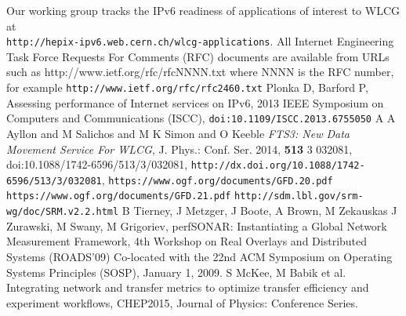 \begin{thebibliography}{1}
 Our working group tracks the IPv6 readiness of applications
of interest to WLCG at\\ {\tt http://hepix-ipv6.web.cern.ch/wlcg-applications}.
 All Internet Engineering Task Force Requests For Comments (RFC) documents are available
from URLs such as http://www.ietf.org/rfc/rfcNNNN.txt where NNNN is the RFC number, for example {\tt http://www.ietf.org/rfc/rfc2460.txt}
 Plonka D, Barford P, Assessing performance of Internet services on IPv6, 2013 IEEE Symposium on Computers and Communications (ISCC), {\tt doi:10.1109/ISCC.2013.6755050}
 {A A Ayllon and M Salichos and M K Simon and O Keeble} {\it {FTS}3: New Data Movement Service For {WLCG}}, {J. Phys.: Conf. Ser.} 2014, {\bf 513} 3 032081,  doi:{10.1088/1742-6596/513/3/032081}, {\tt{http://dx.doi.org/10.1088/1742-6596/513/3/032081}},
 {\tt https://www.ogf.org/documents/GFD.20.pdf} 
 {\tt https://www.ogf.org/documents/GFD.21.pdf} 
 {\tt http://sdm.lbl.gov/srm-wg/doc/SRM.v2.2.html}
 B Tierney, J Metzger, J Boote, A Brown, M Zekauskas
J Zurawski, M Swany, M Grigoriev, perfSONAR: Instantiating a
Global Network Measurement Framework, 4th Workshop on Real Overlays and
Distributed Systems (ROADS’09) Co-located with the 22nd ACM Symposium
on Operating Systems Principles (SOSP), January 1, 2009.
 S McKee, M Babik et al. Integrating network and
transfer metrics to optimize transfer efficiency and experiment workflows,
CHEP2015, Journal of Physics: Conference Series.



\end{thebibliography}
